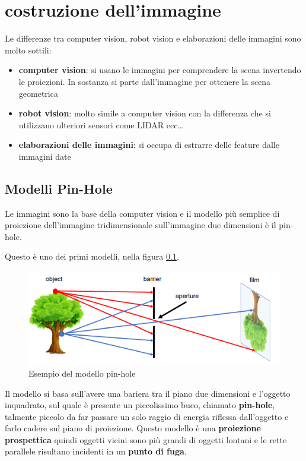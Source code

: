\chapter*{costruzione dell'immagine}

Le differenze tra computer vision, robot vision e elaborazioni delle immagini 
sono molto sottili:
\begin{itemize}
    \item \textbf{computer vision}: si usano le immagini per comprendere la scena 
    invertendo le proiezioni. In sostanza si parte dall'immagine per ottenere la 
    scena geometrica
    \item \textbf{robot vision}: molto simile a computer vision con la differenza 
    che si utilizzano ulteriori sensori come LIDAR ecc\dots
    \item \textbf{elaborazioni delle immagini}: si occupa di estrarre delle feature 
    dalle immagini date
\end{itemize}

\section{Modelli Pin-Hole}
Le immagini sono la base della computer vision e il modello più semplice di 
proiezione dell'immagine tridimensionale sull'immagine due dimensioni è il pin-hole.

Questo è uno dei primi modelli, nella figura \ref{fig:pin_hole}.
\begin{figure}
    \centering
    \includegraphics*[]{./figure/pin-hole.png}
    \caption{Esempio del modello pin-hole}
    \label{fig:pin_hole}
\end{figure}

Il modello si basa sull'avere una bariera tra il piano due dimensioni e l'oggetto
inquadrato, sul quale è presente un piccolissimo buco, chiamato \textbf{pin-hole},
talmente piccolo da far passare un solo raggio di energia riflessa dall'oggetto e
farlo cadere sul piano di proiezione. Questo modello è una \textbf{proiezione prospettica}
quindi oggetti vicini sono più grandi di oggetti lontani e le rette parallele risultano 
incidenti in un \textbf{punto di fuga}.


